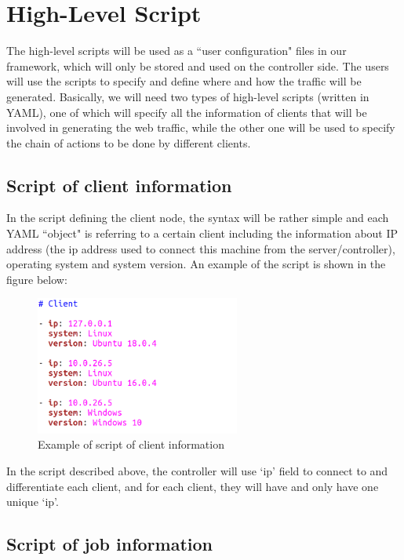 \documentclass[12pt]{report}
\begin{document}
\section{High-Level Script}

The high-level scripts will be used as a ``user configuration" files in our framework, which will only be stored and used on the controller side. The users will use the scripts to specify and define where and how the traffic will be generated. Basically, we will need two types of high-level scripts (written in YAML), one of which will specify all the information of clients that will be involved in generating the web traffic, while the other one will be used to specify the chain of actions to be done by different clients.

\subsection{Script of client information}

In the script defining the client node, the syntax will be rather simple and each YAML ``object" is referring to a certain client including the information about IP address (the ip address used to connect this machine from the server/controller), operating system and system version. An example of the script is shown in the figure below:\\

\begin{figure}[h!]
	\centering
	\includegraphics[width=0.6\textwidth]{./pictures/client-template}
	\caption{Example of script of client information}
\end{figure}

In the script described above, the controller will use `ip' field to connect to and differentiate each client, and for each client, they will have and only have one unique `ip'.

\subsection{Script of job information}
\end{document}
